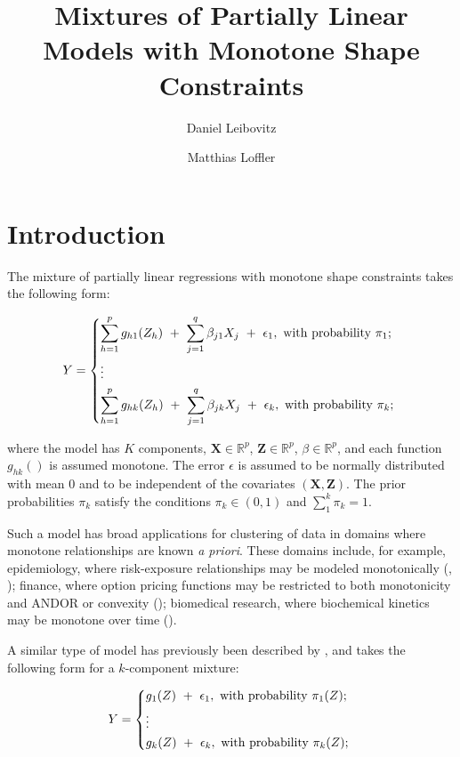 \documentclass[10pt]{olplainarticle}\usepackage[]{graphicx}\usepackage[]{color}
\title{Mixtures of Partially Linear Models with Monotone Shape Constraints}
\author[1]{Daniel Leibovitz}
\author[2]{Matthias Loffler}
\affil[1]{daniel.leibovitz@uzh.ch}
\affil[2]{matthias.loeffler@stat.math.ethz.ch}
\begin{document}
\flushbottom
\maketitle
\thispagestyle{empty}

\section{Introduction}

The mixture of partially linear regressions with monotone shape constraints takes the following form:

\begin{equation} \label{modstrucbrief}
  Y = 
  \begin{dcases}
    \sum_{h=1}^{p} g_{h1} (Z_{h}) \ +\  \sum_{j=1}^{q} \beta_{j1} X_{j} \ +\ \epsilon_1, \text{  with probability $\pi_1$; }\\
    \vdots \\
    \sum_{h=1}^{p} g_{hk} (Z_{h}) \ +\  \sum_{j=1}^{q} \beta_{jk} X_{j} \ +\ \epsilon_k, \text{  with probability $\pi_k$; } \\
  \end{dcases}
\end{equation}

where the model has $K$ components, $\boldsymbol{X} \in \mathbb{R}^p$, $\boldsymbol{Z} \in \mathbb{R}^p$, $\beta \in \mathbb{R}^p$, and each function $g_{hk}()$ is assumed monotone. The error $\epsilon$ is assumed to be normally distributed with mean $0$ and to be independent of the covariates $(\boldsymbol{X}, \boldsymbol{Z})$. The prior probabilities $\pi_k$ satisfy the conditions $\pi_k \in (0,1)$ and $\sum_{1}^{k} \pi_k = 1$.

Such a model has broad applications for clustering of data in domains where monotone relationships are known \emph{a priori}. These domains include, for example, epidemiology, where risk-exposure relationships may be modeled monotonically (\cite{morton}, \cite{carcinogen}); finance, where option pricing functions may be restricted to both monotonicity and ANDOR or convexity (\cite{optionpricing}); biomedical research, where biochemical kinetics may be monotone over time (\cite{kinetics}). 


A similar type of model has previously been described by \cite{zhangetal}, and takes the following form for a $k$-component mixture:

\begin{equation} \label{zhangstruc}
  Y = 
  \begin{dcases}
    g_{1} (Z) \ +\  \epsilon_1 , \text{  with probability $\pi_1(Z)$; }\\
    \vdots \\
    g_{k} (Z) \ +\  \epsilon_k , \text{  with probability $\pi_k(Z)$; }\\
  \end{dcases}
\end{equation}
\end{document}
